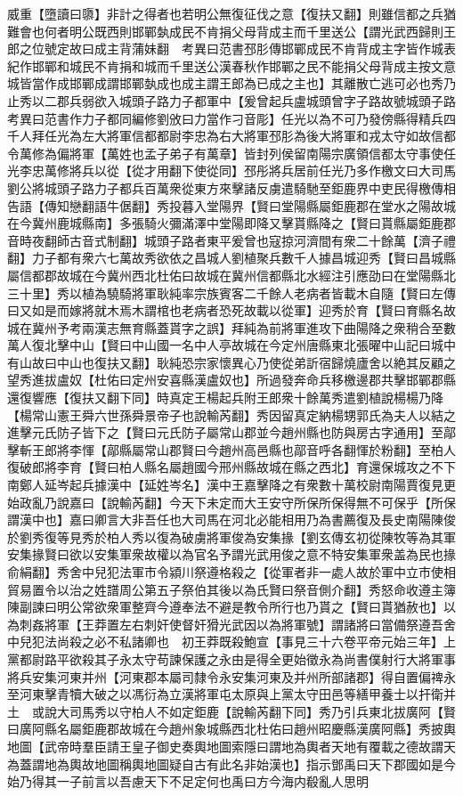 威重【墮讀曰隳】非計之得者也若明公無復征伐之意【復扶又翻】則雖信都之兵猶難會也何者明公既西則邯鄲埶成民不肯捐父母背成主而千里送公【謂光武西歸則王郎之位號定故曰成主背蒲妹翻　考異曰范書邳肜傳邯鄲成民不肯背成主字皆作城表紀作邯鄲和城民不肯捐和城而千里送公漢春秋作邯鄲之民不能捐父母背成主按文意城皆當作成邯鄲成謂邯鄲埶成也成主謂王郎為已成之主也】其離散亡逃可必也秀乃止秀以二郡兵弱欲入城頭子路力子都軍中【爰曾起兵盧城頭曾字子路故號城頭子路　考異曰范書作力子都同編修劉攽曰力當作刁音彫】任光以為不可乃發傍縣得精兵四千人拜任光為左大將軍信都都尉李忠為右大將軍邳肜為後大將軍和戎太守如故信都令萬修為偏將軍【萬姓也孟子弟子有萬章】皆封列侯留南陽宗廣領信都太守事使任光李忠萬修將兵以從【從才用翻下使從同】邳彤將兵居前任光乃多作檄文曰大司馬劉公將城頭子路力子都兵百萬衆從東方來擊諸反虜遣騎馳至鉅鹿界中吏民得檄傳相告語【傳知戀翻語牛倨翻】秀投暮入堂陽界【賢曰堂陽縣屬鉅鹿郡在堂水之陽故城在今冀州鹿城縣南】多張騎火彌滿澤中堂陽即降又擊貰縣降之【賢曰貰縣屬鉅鹿郡音時夜翻師古音式制翻】城頭子路者東平爰曾也寇掠河濟間有衆二十餘萬【濟子禮翻】力子都有衆六七萬故秀欲依之昌城人劉植聚兵數千人據昌城迎秀【賢曰昌城縣屬信都郡故城在今冀州西北杜佑曰故城在冀州信都縣北水經注引應劭曰在堂陽縣北三十里】秀以植為驍騎將軍耿純率宗族賓客二千餘人老病者皆載木自隨【賢曰左傳曰又如是而嫁將就木焉木謂棺也老病者恐死故載以從軍】迎秀於育【賢曰育縣名故城在冀州予考兩漢志無育縣蓋貰字之誤】拜純為前將軍進攻下曲陽降之衆稍合至數萬人復北擊中山【賢曰中山國一名中人亭故城在今定州唐縣東北張曜中山記曰城中有山故曰中山也復扶又翻】耿純恐宗家懷異心乃使從弟訢宿歸燒廬舍以絶其反顧之望秀進拔盧奴【杜佑曰定州安喜縣漢盧奴也】所過發奔命兵移檄邊郡共擊邯鄲郡縣還復響應【復扶又翻下同】時真定王楊起兵附王郎衆十餘萬秀遣劉植說楊楊乃降【楊常山憲王舜六世孫舜景帝子也說輸芮翻】秀因留真定納楊甥郭氏為夫人以結之進擊元氏防子皆下之【賢曰元氏防子屬常山郡並今趙州縣也防與房古字通用】至鄗擊斬王郎將李惲【鄗縣屬常山郡賢曰今趙州高邑縣也鄗音呼各翻惲於粉翻】至柏人復破郎將李育【賢曰柏人縣名屬趙國今邢州縣故城在縣之西北】育還保城攻之不下　南鄭人延岑起兵據漢中【延姓岑名】漢中王嘉擊降之有衆數十萬校尉南陽賈復見更始政亂乃說嘉曰【說輸芮翻】今天下未定而大王安守所保所保得無不可保乎【所保謂漢中也】嘉曰卿言大非吾任也大司馬在河北必能相用乃為書薦復及長史南陽陳俊於劉秀復等見秀於柏人秀以復為破虜將軍俊為安集掾【劉玄傳玄初從陳牧等為其軍安集掾賢曰欲以安集軍衆故權以為官名予謂光武用俊之意不特安集軍衆盖為民也掾俞絹翻】秀舍中兒犯法軍市令潁川祭遵格殺之【從軍者非一處人故於軍中立市使相貿易置令以治之姓譜周公第五子祭伯其後以為氏賢曰祭音側介翻】秀怒命收遵主簿陳副諫曰明公常欲衆軍整齊今遵奉法不避是教令所行也乃貰之【賢曰貰猶赦也】以為刺姦將軍【王莽置左右刺奸使督奸猾光武因以為將軍號】謂諸將曰當備祭遵吾舍中兒犯法尚殺之必不私諸卿也　初王莽既殺鮑宣【事見三十六卷平帝元始三年】上黨都尉路平欲殺其子永太守苟諫保護之永由是得全更始徵永為尚書僕射行大將軍事將兵安集河東并州【河東郡本屬司隸令永安集河東及并州所部諸郡】得自置偏禆永至河東擊青犢大破之以馮衍為立漢將軍屯太原與上黨太守田邑等繕甲養士以扞衛并土　或說大司馬秀以守柏人不如定鉅鹿【說輸芮翻下同】秀乃引兵東北拔廣阿【賢曰廣阿縣名屬鉅鹿郡故城在今趙州象城縣西北杜佑曰趙州昭慶縣漢廣阿縣】秀披輿地圖【武帝時羣臣請王皇子御史奏輿地圖索隱曰謂地為輿者天地有覆載之德故謂天為蓋謂地為輿故地圖稱輿地圖疑自古有此名非始漢也】指示鄧禹曰天下郡國如是今始乃得其一子前言以吾慮天下不足定何也禹曰方今海内殽亂人思明